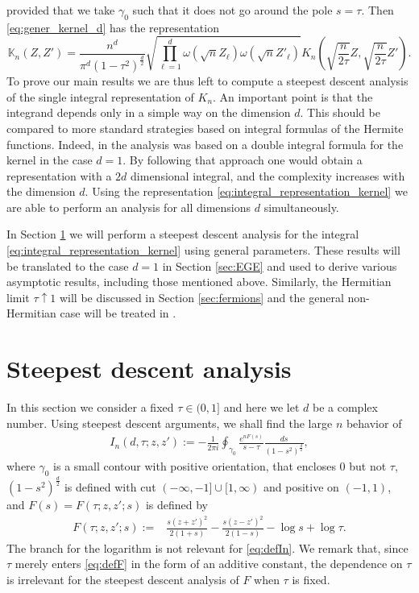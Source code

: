 \documentclass[%
 jmp,
cp,  %
 amsmath,amsthm,amssymb,%
 reprint,%
onecolumn]{revtex4-2}
\begin{document}
provided that we take $\gamma_0$ such that it does not go around  the pole $s=\tau$. 
Then \eqref{eq:gener_kernel_d} has the representation
\begin{equation} \label{eq:kernelboldKtoK}
 \mathbb K_n(Z,Z')= \frac{n^d}{\pi^d (1-\tau^2)^\frac{d}{2}} 
 \sqrt{\prod_{\ell=1}^d \omega(\sqrt n Z_\ell) \omega(\sqrt n Z'_\ell)}  K_n\left(\sqrt{\frac{n}{2\tau}} Z, \sqrt{\frac{n}{2\tau}} {Z'}\right).
\end{equation}
To prove our main results we are thus left to compute a steepest descent analysis of the single integral representation of  $K_n$. An important point is that the integrand depends only in a simple way on the dimension $d$. This should be compared to more standard strategies based on integral formulas of the Hermite functions. Indeed, in \cite{Be}  the analysis was based on a double integral formula for the kernel in the case $d=1$. By following that approach one would obtain a representation with a $2d$ dimensional integral, and the complexity increases with the dimension $d$. Using the representation \eqref{eq:integral_representation_kernel} we are able to perform an analysis for all dimensions $d$ simultaneously.  

In Section \ref{sec:steepest} we will perform a steepest descent analysis for the integral \eqref{eq:integral_representation_kernel} using general parameters. These results will be translated to the case $d=1$ in Section \ref{sec:EGE} and used to derive various asymptotic results, including those mentioned above. Similarly, the Hermitian limit $\tau \uparrow 1$ will be discussed in Section \ref{sec:fermions} and the general non-Hermitian case will be treated in .





\section{Steepest descent analysis} \label{sec:steepest}

In this section we consider a fixed $\tau\in(0,1]$ and here we let $d$ be a complex number. Using steepest descent arguments, we shall find the large $n$ behavior of 
\begin{align} \label{eq:defIn}
I_n(d,\tau;z,z') := -\frac{1}{2\pi i} \oint_{\gamma_0} \frac{e^{n F(s)}}{s-\tau} \frac{ds}{(1-s^2)^\frac{d}{2}},
\end{align}
where $\gamma_0$ is a small contour with positive orientation, that encloses $0$ but not $\tau$, $(1-s^2)^\frac{d}{2}$ is defined with cut $(-\infty,-1]\cup [1,\infty)$ and positive on $(-1,1)$, and $F(s) = F(\tau;z, z'; s)$ is defined by
\begin{align} \label{eq:defF}
F\left(\tau;z, z'; s\right) :=& \frac{s(z+z')^2}{2(1+s)}-\frac{s (z-z')^2}{2(1-s)} - \log s + \log \tau.
\end{align}
The branch for the logarithm is not relevant for \eqref{eq:defIn}. We remark that, since $\tau$ merely enters \eqref{eq:defF} in the form of an additive constant, the dependence on $\tau$ is irrelevant for the steepest descent analysis of $F$ when $\tau$ is fixed. 
\end{document}
